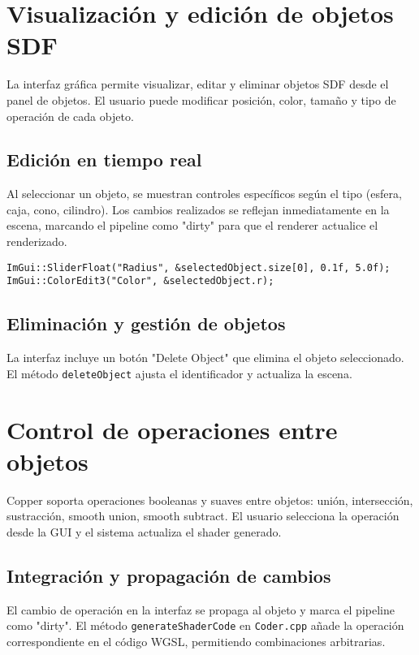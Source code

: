 \section{Visualización y edición de objetos SDF}

La interfaz gráfica permite visualizar, editar y eliminar objetos SDF desde el
panel de objetos. El usuario puede modificar posición, color, tamaño y tipo de
operación de cada objeto.

\subsection{Edición en tiempo real}

Al seleccionar un objeto, se muestran controles específicos según el tipo
(esfera, caja, cono, cilindro). Los cambios realizados se reflejan
inmediatamente en la escena, marcando el pipeline como "dirty" para que el
renderer actualice el renderizado.

\begin{verbatim}
ImGui::SliderFloat("Radius", &selectedObject.size[0], 0.1f, 5.0f);
ImGui::ColorEdit3("Color", &selectedObject.r);
\end{verbatim}

\subsection{Eliminación y gestión de objetos}

La interfaz incluye un botón "Delete Object" que elimina el objeto
seleccionado. El método \texttt{deleteObject} ajusta el identificador y
actualiza la escena.

\section{Control de operaciones entre objetos}

Copper soporta operaciones booleanas y suaves entre objetos: unión,
intersección, sustracción, smooth union, smooth subtract. El usuario selecciona
la operación desde la GUI y el sistema actualiza el shader generado.

\subsection{Integración y propagación de cambios}

El cambio de operación en la interfaz se propaga al objeto y marca el pipeline
como "dirty". El método \texttt{generateShaderCode} en \texttt{Coder.cpp} añade
la operación correspondiente en el código WGSL, permitiendo combinaciones
arbitrarias.

